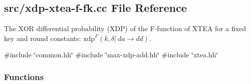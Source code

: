 \hypertarget{xdp-xtea-f-fk_8cc}{\subsection{src/xdp-\/xtea-\/f-\/fk.cc \-File \-Reference}
\label{xdp-xtea-f-fk_8cc}
}


\-The \-X\-O\-R differential probability (\-X\-D\-P) of the \-F-\/function of \-X\-T\-E\-A for a fixed key and round constants\-: $\mathrm{xdp}^{F}(k, \delta |~ da \rightarrow dd)$.  


{\ttfamily \#include \char`\"{}common.\-hh\char`\"{}}\*
{\ttfamily \#include \char`\"{}max-\/xdp-\/add.\-hh\char`\"{}}\*
{\ttfamily \#include \char`\"{}xtea.\-hh\char`\"{}}\*
\subsubsection*{\-Functions}
